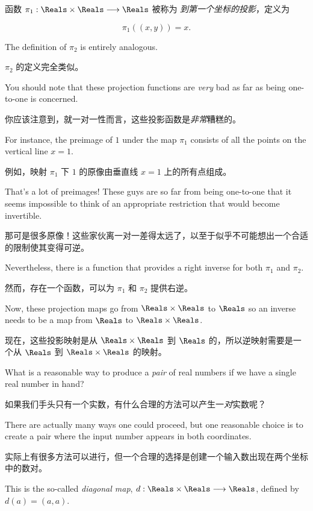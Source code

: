 \begin{defi}
函数 $\pi_1: \Reals \times \Reals \longrightarrow \Reals$ 被称为 \emph{到第一个坐标的投影}，定义为

\[ \pi_1((x,y)) = x. \]
 
\end{defi}

The definition of $\pi_2$ is entirely analogous.  

$\pi_2$ 的定义完全类似。

You should note that these projection functions are \emph{very} bad 
as far as being one-to-one is concerned.

你应该注意到，就一对一性而言，这些投影函数是\emph{非常}糟糕的。

For instance, the preimage
of $1$ under the map $\pi_1$ consists of all the points on the vertical line
$x=1$.

例如，映射 $\pi_1$ 下 $1$ 的原像由垂直线 $x=1$ 上的所有点组成。

That's a lot of preimages!  These guys are so far from being 
one-to-one that it seems impossible to think of an appropriate restriction
that would become invertible.

那可是很多原像！这些家伙离一对一差得太远了，以至于似乎不可能想出一个合适的限制使其变得可逆。

Nevertheless, there is a function that 
provides a right inverse for both $\pi_1$ and $\pi_2$.

然而，存在一个函数，可以为 $\pi_1$ 和 $\pi_2$ 提供右逆。

Now, these projection
maps go from $\Reals \times \Reals$ to $\Reals$ so an inverse needs to be
a map from $\Reals$ to $\Reals \times \Reals$.

现在，这些投影映射是从 $\Reals \times \Reals$ 到 $\Reals$ 的，所以逆映射需要是一个从 $\Reals$ 到 $\Reals \times \Reals$ 的映射。

What is a reasonable way to
produce a \emph{pair} of real numbers if we have a single real number in hand?

如果我们手头只有一个实数，有什么合理的方法可以产生一\emph{对}实数呢？

There are actually many ways one could proceed, but one reasonable choice is
to create a pair where the input number appears in both coordinates.

实际上有很多方法可以进行，但一个合理的选择是创建一个输入数出现在两个坐标中的数对。

This
is the so-called \emph{diagonal map}, 
$d:\Reals \times \Reals \longrightarrow \Reals$, defined by $d(a) = (a,a)$.

